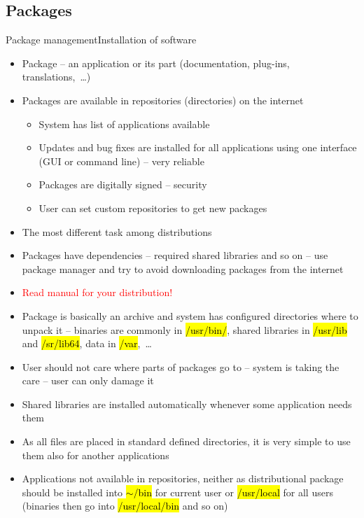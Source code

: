 \documentclass[compress, ucs, xelatex, 11pt, xcolor=svgnames,
  hyperref={
    bookmarks=true,
    unicode=true,
    colorlinks=true,
    pdftitle={Linux, command line and MetaCentrum},
    plainpages=false,
    pdfauthor={Vojtech Zeisek},
    pdfsubject={Course about use of Linux command line, writing shell scripts and using MetaCentrum of CESNET},
    pdfcreator={XeLaTeX},
    pdfkeywords={Linux, GNU, BASH, shell, command line, MetaCentrum},
    linkcolor=DarkRed,
    anchorcolor=DarkBlue,
    citecolor=Indigo,
    filecolor=NavyBlue,
    menucolor=DarkMagenta,
    urlcolor=DarkBlue,
    pdftex},
  url={hyphens, lowtilde} %
  ]{beamer}
\renewcommand{\texttt}[1]{\hl{\ttfamily #1}}
\renewcommand{\alert}[1]{\textcolor{red}{#1}}
\begin{document}
\subsection{Packages}

\begin{frame}[allowframebreaks]{Package management}{Installation of software}
  \begin{itemize}
    \item Package -- an application or its part (documentation, plug-ins, translations,~\ldots)
    \item Packages are available in repositories (directories) on the internet
    \begin{itemize}
      \item System has list of applications available
      \item Updates and bug fixes are installed for all applications using one interface (GUI or command line) -- very reliable
      \item Packages are digitally signed -- security
      \item User can set custom repositories to get new packages
    \end{itemize}
    \item The most different task among distributions
    \item Packages have dependencies -- required shared libraries and so on -- use package manager and try to avoid downloading packages from the internet
    \item \alert{Read manual for your distribution!}
    \item Package is basically an archive and system has configured directories where to unpack it -- binaries are commonly in \texttt{/usr/bin/}, shared libraries in \texttt{/usr/lib} and \texttt{/sr/lib64}, data in \texttt{/var},~\ldots
    \item User should not care where parts of packages go to -- system is taking the care -- user can only damage it
    \item Shared libraries are installed automatically whenever some application needs them
    \item As all files are placed in standard defined directories, it is very simple to use them also for another applications
    \item Applications not available in repositories, neither as distributional package should be installed into \texttt{$\sim$/bin} for current user or \texttt{/usr/local} for all users (binaries then go into \texttt{/usr/local/bin} and so on)

\end{itemize}
\end{frame}
\end{document}
